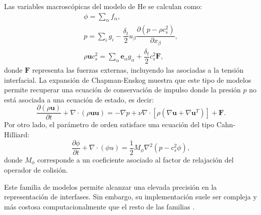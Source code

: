 Las variables macrosc\'opicas del modelo de He se calculan como:
\begin{equation}
	\begin{gathered}
		\phi = \sum_{\alpha} f_{\alpha}, \\
		p = \sum_i g_i - \dfrac{\delta_t}{2} u_{\beta} \dfrac{\partial(p - \rho c_s^2)}{\partial x_{\beta}}, \\
		\rho \bm{u}c_s^2 = \sum_{\alpha} \bm{e}_{\alpha}g_{\alpha} + \dfrac{\delta_t}{2}c_s^2 \bm{F},
	\end{gathered}
	\label{eq:he_macro_variables}
\end{equation}
donde $\bm{F}$ representa las fuerzas externas, incluyendo las asociadas a la tensi\'on interfacial. La expansi\'on de Chapman-Enskog muestra que este tipo de modelos permite recuperar una ecuaci\'on de conservaci\'on de impulso donde la presi\'on $p$ no est\'a asociada a una ecuaci\'on de estado, es decir:
\begin{equation}
	\dfrac{\partial (\rho \bm{u})}{\partial t} + \nabla \cdot (\rho \bm{uu})  = -\nabla p  + \nu \nabla \cdot \left[ \rho (\nabla\bm{u} + \nabla \bm{u}^T) \right] + \bm{F}.
\end{equation}
Por otro lado, el par\'ametro de orden satisface una ecuaci\'on del tipo Cahn-Hilliard:
\begin{equation}
	\dfrac{\partial \phi}{\partial t} + \nabla \cdot (\phi \bm{}u) = \dfrac{1}{2} M_{\phi} \nabla^2 (p - c_s^2 \phi),
\end{equation}
donde $M_{\phi}$ corresponde a un coeficiente asociado al factor de relajaci\'on del operador de colisi\'on. 

Este familia de modelos permite alcanzar una elevada precisi\'on en la representaci\'on de interfases. Sin embargo, su implementaci\'on suele ser compleja y m\'as costosa computacionalmente que el resto de las familias \cite{huang_multiphase_2015}.



